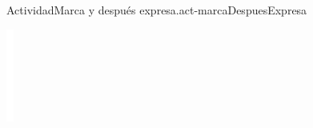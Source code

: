 \documentclass[14pt]{extarticle}
\begin{document}
\begin{activity}{Actividad}{Marca y después expresa.}{act-marcaDespuesExpresa}
\begin{image}{0}{1}{0}{}
\includegraphics[scale=1.2, max width=\linewidth]{external/whitespace-tikz/2cm.pdf}
\par\vspace{1cm}
\end{image}%
\end{activity}
\end{document}

